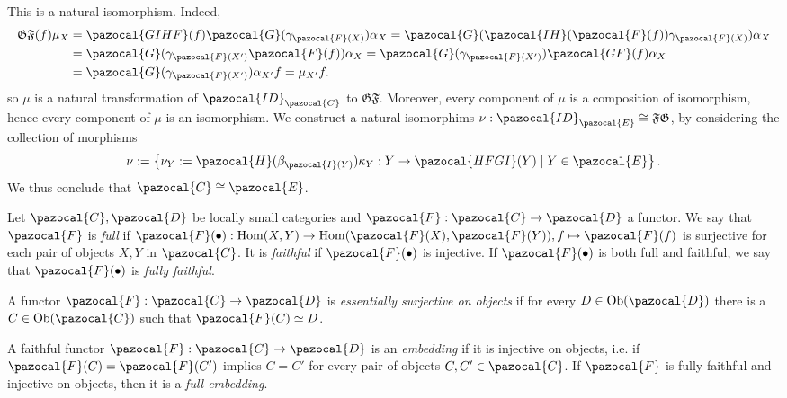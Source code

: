 \begin{remark}
\begin{itemize}
$$            $$
            This is a natural isomorphism. Indeed, 
            \begin{align*}
                \mathfrak{GF}(f)\mu_X&= \pazocal{GIHF}(f)\pazocal{G}(\gamma_{\pazocal{F}(X)})\alpha_X = \pazocal{G}(\pazocal{IH}(\pazocal{F}(f))\gamma_{\pazocal{F}(X)})\alpha_X\\ 
                &= \pazocal{G}(\gamma_{\pazocal{F}(X')}\pazocal{F}(f))\alpha_X = \pazocal{G}(\gamma_{\pazocal{F}(X')})\pazocal{GF}(f)\alpha_X\\
                &= \pazocal{G}(\gamma_{\pazocal{F}(X')})\alpha_{X'}f = \mu_{X'}f. 
            \end{align*}
            so $\mu$ is a natural transformation of $\pazocal{ID}_{\pazocal{C}}$ to $\mathfrak{GF}$. Moreover, every component of $\mu$ is a composition of isomorphism, hence every component of $\mu$ is an isomorphism. We construct a natural isomorphims $\nu : \pazocal{ID}_\pazocal{E}\cong \mathfrak{F}\mathfrak{G}$, by considering the collection of morphisms 
            $$
                \nu := \left\{ \nu_Y:= \pazocal{H}(\beta_{\pazocal{I}(Y)})\kappa_Y :Y \rightarrow \pazocal{HFGI}(Y)\mid Y\in\pazocal{E}\right\}.
            $$
            We thus conclude that $\pazocal{C}\cong \pazocal{E}$.
        \end{itemize}
    \end{remark}
    \begin{definition}
        Let $\pazocal{C},\pazocal{D}$ be locally small categories and $\pazocal{F} : \pazocal{C}\rightarrow \pazocal{D}$ a functor. We say that $\pazocal{F}$ is \emph{full} if $\pazocal{F}(\bullet):\Hom(X,Y)\rightarrow \Hom(\pazocal{F}(X),\pazocal{F}(Y)), f\mapsto \pazocal{F}(f)$ is surjective for each pair of objects $X,Y$ in $\pazocal{C}$. It is \emph{faithful} if $\pazocal{F}(\bullet)$ is injective. If $\pazocal{F}(\bullet)$ is both full and faithful, we say that $\pazocal{F}(\bullet)$ is \emph{fully faithful}.
    \end{definition}
    \begin{definition}
        A functor $\pazocal{F} : \pazocal{C}\rightarrow \pazocal{D}$ is \emph{essentially surjective on objects} if for every $D\in \Ob(\pazocal{D})$ there is a $C\in \Ob(\pazocal{C})$ such that $\pazocal{F}(C)\simeq D$. 
    \end{definition}
    \begin{definition}
        A faithful functor $\pazocal{F}:\pazocal{C}\rightarrow\pazocal{D}$ is an \emph{embedding} if it is injective on objects, i.e. if $\pazocal{F}(C)=\pazocal{F}(C')$ implies $C=C'$ for every pair of objects $C,C'\in \pazocal{C}$. If $\pazocal{F}$ is fully faithful and injective on objects, then it is a \emph{full embedding}.
    \end{definition}
